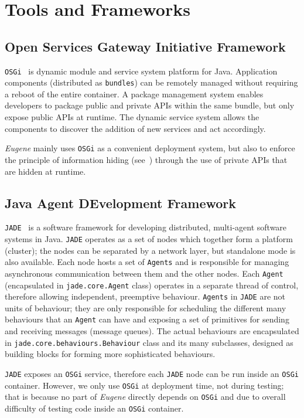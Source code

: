 \section{Tools and Frameworks}
\label{Chapters/Background/Tools-and-Frameworks}

\subsection{Open Services Gateway Initiative Framework}
\label{Chapters/Background/OSGi}
\texttt{OSGi}~\cite{OSGi} is dynamic module and service system platform for Java. Application components (distributed as \texttt{bundles}) can be remotely managed without requiring a reboot of the entire container. A package management system enables developers to package public and private APIs within the same bundle, but only expose public APIs at runtime. The dynamic service system allows the components to discover the addition of new services and act accordingly.

\textit{Eugene} mainly uses \texttt{OSGi} as a convenient deployment system, but also to enforce the principle of information hiding (see~) through the use of private APIs that are hidden at runtime.

\subsection{Java Agent DEvelopment Framework}
\texttt{JADE}~\cite{JADE} is a software framework for developing distributed, multi-agent software systems in Java. \texttt{JADE} operates as a set of nodes which together form a platform (cluster); the nodes can be separated by a network layer, but standalone mode is also available. Each node hosts a set of \texttt{Agents} and is responsible for managing asynchronous communication between them and the other nodes. Each \texttt{Agent} (encapsulated in \texttt{jade.core.Agent} class) operates in a separate thread of control, therefore allowing independent, preemptive behaviour. \texttt{Agents} in \texttt{JADE} are not units of behaviour; they are only responsible for scheduling the different many behaviours that an \texttt{Agent} can have and exposing a set of primitives for sending and receiving messages (message queues). The actual behaviours are encapsulated in \texttt{jade.core.behaviours.Behaviour} class and its many subclasses, designed as building blocks for forming more sophisticated behaviours.

\texttt{JADE} exposes an \texttt{OSGi} service, therefore each \texttt{JADE} node can be run inside an \texttt{OSGi} container. However, we only use \texttt{OSGi} at deployment time, not during testing; that is because no part of \textit{Eugene} directly depends on \texttt{OSGi} and due to overall difficulty of testing code inside an \texttt{OSGi} container.

